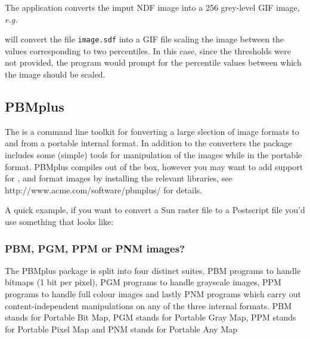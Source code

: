 \documentclass[twoside,11pt]{starlink}
\begin{document}
The application converts the imput NDF image into a 256 grey-level GIF image, \emph{e.g.\ }

\begin{terminalv}
\end{terminalv}

will convert the file \texttt{image.sdf} into a GIF file scaling the
image between the values corresponding to two percentiles. In this
case, since the thresholds were not provided, the program would prompt
for the percentile values between which the image should be scaled.

\subsection{PBMplus\label{sc15_pbmplus}}

The  is a command line
toolkit for fonverting a large slection of image formats to and from a
portable internal format. In addition to the converters the package
includes some (simple) tools for manipulation of the images while in
the portable format. PBMplus compiles out of the box, however you may
want to add support for
,
 and
format images by installing the relevant libraries, see
http://www.acme.com/software/pbmplus/ for details.

A quick example, if you want to convert a Sun raster file to a
Postscript file you'd use something that looks like:

\begin{terminalv}
\end{terminalv}

\subsubsection{PBM, PGM, PPM or PNM images?}

The PBMplus package is split into four distinct suites. PBM programs
to handle bitmaps (1 bit per pixel), PGM programs to handle grayscale
images, PPM programs to handle full colour images and lastly PNM
programs which carry out content-independent manipulations on any of
the three internal formats. PBM stands for Portable Bit Map, PGM
stands for Portable Gray Map, PPM stands for Portable Pixel Map and PNM
stands for Portable Any Map
\end{document}

